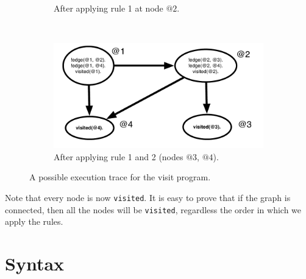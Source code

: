 \begin{figure}[h]
\begin{subfigure}[b]{0.5\textwidth}
                \caption{After applying rule 1 at node $@2$.}
                \label{fig:exec_trace3}
        \end{subfigure}%
        ~ %
        \begin{subfigure}[b]{0.5\textwidth}
                  \includegraphics[width=\textwidth]{execution_trace4}
                  \caption{After applying rule 1 and 2 (nodes $@3$, $@4$).}
                  \label{fig:exec_trace4}
          \end{subfigure}
        \caption{A possible execution trace for the visit program.}\label{fig:exec_trace}
\end{figure}

Note that every node is now \texttt{visited}. It is easy to prove that if the graph is
connected, then all the nodes will be \texttt{visited}, regardless the order in which we
apply the rules.

\section{Syntax}

\renewcommand{\arraystretch}{1.5}

